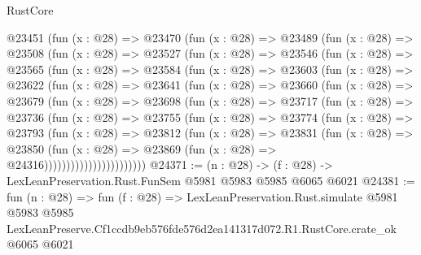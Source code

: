 \begin{lexlean}{RustCore}
\begin{coremodule}
  @23451
    (fun (x : @28) =>
    @23470
      (fun (x : @28) =>
      @23489
        (fun (x : @28) =>
        @23508
          (fun (x : @28) =>
          @23527
            (fun (x : @28) =>
            @23546
              (fun (x : @28) =>
              @23565
                (fun (x : @28) =>
                @23584
                  (fun (x : @28) =>
                  @23603
                    (fun (x : @28) =>
                    @23622
                      (fun (x : @28) =>
                      @23641
                        (fun (x : @28) =>
                        @23660
                          (fun (x : @28) =>
                          @23679
                            (fun (x : @28) =>
                            @23698
                              (fun (x : @28) =>
                              @23717
                                (fun (x : @28) =>
                                @23736
                                  (fun (x : @28) =>
                                  @23755
                                    (fun (x : @28) =>
                                    @23774
                                      (fun (x : @28) =>
                                      @23793
                                        (fun (x : @28) =>
                                        @23812
                                          (fun (x : @28) =>
                                          @23831
                                            (fun (x : @28) =>
                                            @23850
                                              (fun (x : @28) =>
                                              @23869 (fun (x : @28) => @24316)))))))))))))))))))))))
@24371 := (n : @28) -> (f : @28) -> LexLeanPreservation.Rust.FunSem @5981 @5983 @5985 @6065 @6021
@24381 := fun (n : @28) =>
  fun (f : @28) =>
  LexLeanPreservation.Rust.simulate
    @5981
    @5983
    @5985
    LexLeanPreserve.Cf1ccdb9eb576fde576d2ea141317d072.R1.RustCore.crate_ok
    @6065
    @6021
\end{coremodule}
\end{lexlean}
